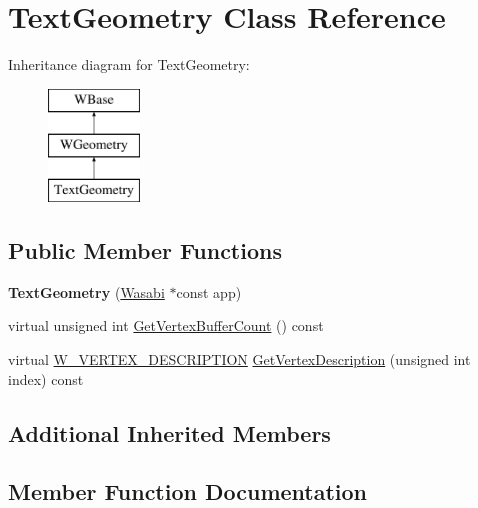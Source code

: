 \hypertarget{class_text_geometry}{}\section{Text\+Geometry Class Reference}
\label{class_text_geometry}
Inheritance diagram for Text\+Geometry\+:\begin{figure}[H]
\begin{center}
\leavevmode
\includegraphics[height=3.000000cm]{class_text_geometry}
\end{center}
\end{figure}
\subsection*{Public Member Functions}
\begin{DoxyCompactItemize}
\item 
{\bfseries Text\+Geometry} (\hyperlink{class_wasabi}{Wasabi} $\ast$const app)\hypertarget{class_text_geometry_a0986f8490b6a03fe4b63cef1d32b0ae8}{}\label{class_text_geometry_a0986f8490b6a03fe4b63cef1d32b0ae8}

\item 
virtual unsigned int \hyperlink{class_text_geometry_a0d6f019bc0034edcfdb51fe743e3b681}{Get\+Vertex\+Buffer\+Count} () const 
\item 
virtual \hyperlink{struct_w___v_e_r_t_e_x___d_e_s_c_r_i_p_t_i_o_n}{W\+\_\+\+V\+E\+R\+T\+E\+X\+\_\+\+D\+E\+S\+C\+R\+I\+P\+T\+I\+ON} \hyperlink{class_text_geometry_a048ec440054230443d89317dd09d2731}{Get\+Vertex\+Description} (unsigned int index) const 
\end{DoxyCompactItemize}
\subsection*{Additional Inherited Members}


\subsection{Member Function Documentation}
